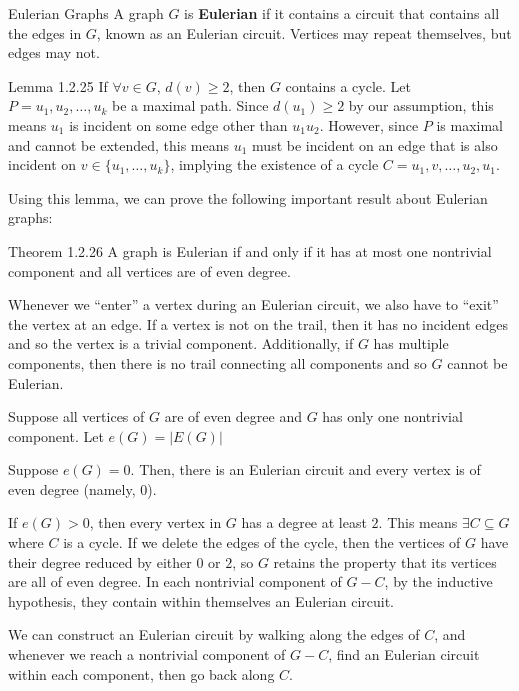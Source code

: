 \documentclass[10pt]{extarticle}
\begin{document}
\begin{problem}{Eulerian Graphs}
  A graph $G$ is \textbf{Eulerian} if it contains a circuit that contains all the edges in $G$, known as an Eulerian circuit. Vertices may repeat themselves, but edges may not.\\
  \begin{problem}{Lemma 1.2.25}
    If $\forall v\in G$, $d(v) \geq 2$, then $G$ contains a cycle.
    \tcblower
    Let $P = u_1,u_2,\dots,u_k$ be a maximal path. Since $d(u_1)\geq 2$ by our assumption, this means $u_1$ is incident on some edge other than $u_1u_2$. However, since $P$ is maximal and cannot be extended, this means $u_1$ must be incident on an edge that is also incident on $v\in \{u_1,\dots,u_k\}$, implying the existence of a cycle $C = u_1,v,\dots,u_2,u_1$.
  \end{problem}
  Using this lemma, we can prove the following important result about Eulerian graphs:
  \begin{problem}{Theorem 1.2.26}
    A graph is Eulerian if and only if it has at most one nontrivial component and all vertices are of even degree.
    \tcblower
    \begin{description}[font=\normalfont\scshape]
      \item[($\Rightarrow$)] Whenever we ``enter'' a vertex during an Eulerian circuit, we also have to ``exit'' the vertex at an edge. If a vertex is not on the trail, then it has no incident edges and so the vertex is a trivial component. Additionally, if $G$ has multiple components, then there is no trail connecting all components and so $G$ cannot be Eulerian.

      \item[($\Leftarrow$)] Suppose all vertices of $G$ are of even degree and $G$ has only one nontrivial component. Let $e(G) = |E(G)|$
      \begin{description}[font=\normalfont\scshape]
        \item[Base Case] Suppose $e(G) = 0$. Then, there is an Eulerian circuit and every vertex is of even degree (namely, $0$).
        \item[Inductive Hypothesis] If $e(G) > 0$, then every vertex in $G$ has a degree at least $2$. This means $\exists C\subseteq G$ where $C$ is a cycle. If we delete the edges of the cycle, then the vertices of $G$ have their degree reduced by either $0$ or $2$, so $G$ retains the property that its vertices are all of even degree. In each nontrivial component of $G-C$, by the inductive hypothesis, they contain within themselves an Eulerian circuit.
        \item[Proof] We can construct an Eulerian circuit by walking along the edges of $C$, and whenever we reach a nontrivial component of $G-C$, find an Eulerian circuit within each component, then go back along $C$.
      \end{description}
    \end{description}
  \end{problem}
\end{problem}
\end{document}
